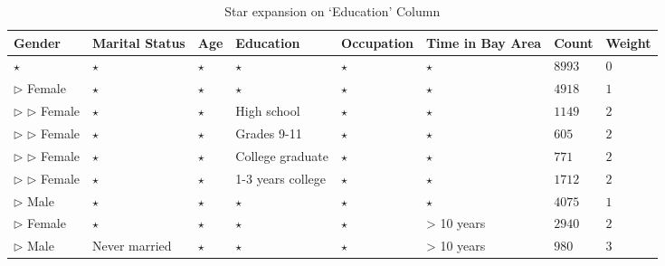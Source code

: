 \begin{table} 
\centering 
\scriptsize
\begin{tabular}{| p{1.5cm} | p{1.5cm} | p{1.5cm} | p{1.5cm} | p{1.5cm} | p{1.5cm} | l | l |} 
\hline Gender & Marital Status & Age & Education & Occupation & Time in Bay Area & Count & Weight \\ \hline 
\cline{1-8} $\star$ & $\star$ & $\star$ & $\star$ & $\star$ & $\star$ & $8993$ & $0$ \\
\cline{1-1} \cline{2-2} \cline{3-3} \cline{4-4} \cline{5-5} \cline{6-6} \cline{7-8} $\triangleright$ Female & $\star$ & $\star$ & $\star$ & $\star$ & $\star$ & $4918$ & $1$ \\
\cline{2-2} \cline{3-3} \cline{4-4} \cline{5-5} \cline{6-6} \cline{7-8} $\triangleright$ $\triangleright$ Female & $\star$ & $\star$ & High school & $\star$ & $\star$ & $1149$ & $2$ \\
\cline{2-2} \cline{3-3} \cline{4-4} \cline{5-5} \cline{6-6} \cline{7-8} $\triangleright$ $\triangleright$ Female & $\star$ & $\star$ & Grades 9-11 & $\star$ & $\star$ & $605$ & $2$ \\
\cline{2-2} \cline{3-3} \cline{4-4} \cline{5-5} \cline{6-6} \cline{7-8} $\triangleright$ $\triangleright$ Female & $\star$ & $\star$ & College graduate & $\star$ & $\star$ & $771$ & $2$ \\
\cline{2-2} \cline{3-3} \cline{4-4} \cline{5-5} \cline{6-6} \cline{7-8} $\triangleright$ $\triangleright$ Female & $\star$ & $\star$ & 1-3 years college & $\star$ & $\star$ & $1712$ & $2$ \\
\cline{1-1} \cline{2-2} \cline{3-3} \cline{4-4} \cline{5-5} \cline{6-6} \cline{7-8} $\triangleright$ Male & $\star$ & $\star$ & $\star$ & $\star$ & $\star$ & $4075$ & $1$ \\
\cline{1-1} \cline{2-2} \cline{3-3} \cline{4-4} \cline{5-5} \cline{6-6} \cline{7-8} $\triangleright$ Female & $\star$ & $\star$ & $\star$ & $\star$ & > 10 years & $2940$ & $2$ \\
\cline{1-1} \cline{2-2} \cline{3-3} \cline{4-4} \cline{5-5} \cline{6-6} \cline{7-8} $\triangleright$ Male & Never married & $\star$ & $\star$ & $\star$ & > 10 years & $980$ & $3$ \\
\hline 
\end{tabular} 
\vspace{-10pt}
\caption{Star expansion on `Education' Column \label{table:uiexamplestar}} 
\vspace{-10pt}
\end{table} 

